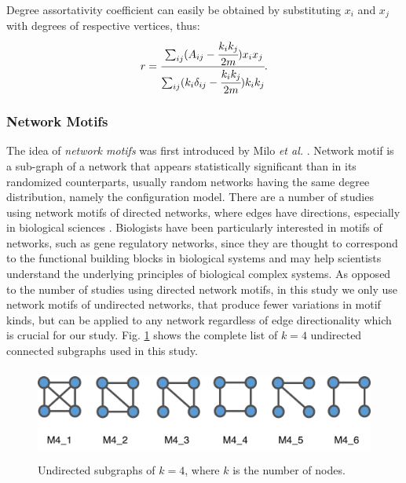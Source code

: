 \documentclass[..]{revtex4}
\begin{document}
Degree assortativity coefficient can easily be obtained by substituting $x_i$ and $x_j$ with degrees of respective vertices, thus:
	\begin{equation}
	 r =  \cfrac{\sum_{ij}(A_{ij} - \cfrac{k_i k_j}{2m})x_i x_j}{\sum_{ij}(k_i \delta_{ij} - \cfrac{k_i k_j}{2m}) k_i k_j}.
	\end{equation}

	\subsubsection{Network Motifs} 
The idea of \textit{network motifs} was first introduced by Milo \textit{et al.} \cite{Milo_motif}. Network motif is a sub-graph of a network that appears statistically significant than in its randomized counterparts, usually random networks having the same degree distribution, namely the configuration model. There are a number of studies using network motifs of directed networks, where edges have directions, especially in biological sciences \cite{Alon2007, MotifsInBrain, NetworkMotifsEcoli}. Biologists have been particularly interested in motifs of networks, such as gene regulatory networks, since they are thought to correspond to the functional building blocks in biological systems and may help scientists understand the underlying principles of biological complex systems.
As opposed to the number of studies using directed network motifs, in this study we only use network motifs of undirected networks, that produce fewer variations in motif kinds, but can be applied to any network regardless of edge directionality which is crucial for our study. Fig. \ref{motifs} shows the complete list of $k=4$ undirected connected subgraphs used in this study.

\begin{figure}[ht]
	\begin{center}
		\vspace{0.5cm}
		\includegraphics[clip,width=12cm,height = 3cm]{figs/motifs.png}
		\vspace{0.5cm}
		\caption{Undirected subgraphs of $k =4$, where $k$ is the number of nodes.}
		\label{motifs}
	\end{center}
\end{figure}
\end{document}
